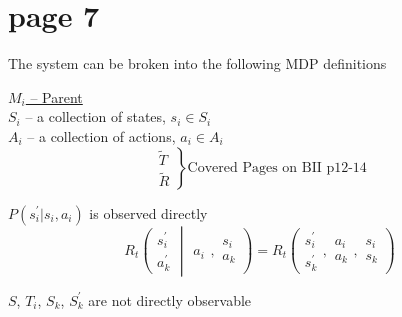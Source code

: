 \section*{page 7}

The system can be broken into the following MDP definitions

\underline{$M_i$ -- Parent}\\

$S_i$ -- a collection of states, $s_i\in S_i$\\
$A_i$ -- a collection of actions, $a_i \in A_i$\\

\begin{equation*}
\left. \begin{array}{l}
\tilde{T}\\
\tilde{R}
\end{array}\right\}
\text{Covered Pages on BII p12-14}
\end{equation*}

$P(s^\prime_i|s_i, a_i)$ is observed directly\\


\begin{equation*}
R_t\left(  \begin{array}{l} s^\prime_i \\ a^\prime_k \end{array}
\middle| 
\begin{array}{c} \\ a_i \end{array},
\begin{array}{c} s_i \\ a_k \end{array}
\right) 
=
R_t\left( 
\begin{array}{c} s^\prime_i \\ s^\prime_k \end{array},
\begin{array}{c} a_i \\ a_k \end{array},
\begin{array}{c} s_i \\ s_k \end{array}
\right)
\end{equation*}


$S$, $T_i$, $S_k$, $S^\prime_k$ are not directly observable\\

